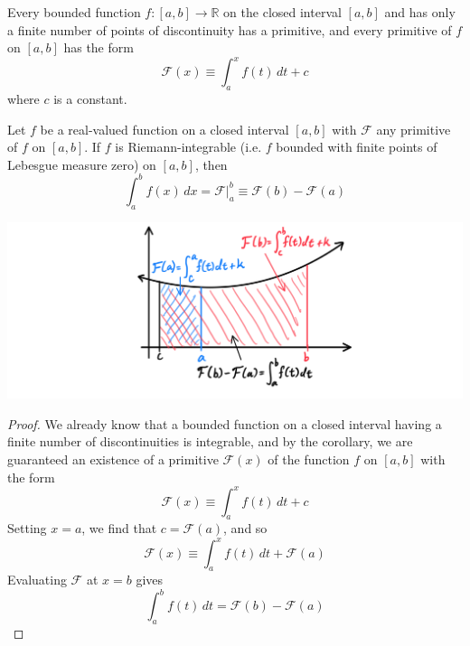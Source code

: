     \begin{corollary}
    Every bounded function $f: [a, b] \longrightarrow \mathbb{R}$ on the closed interval $[a, b]$ and has only a finite number of points of discontinuity has a primitive, and every primitive of $f$ on $[a, b]$ has the form 
    \[\mathcal{F}(x) \equiv \int_a^x f(t)\,dt + c\]
    where $c$ is a constant. 
    \end{corollary}

    \begin{theorem}
    Let $f$ be a real-valued function on a closed interval $[a, b]$ with $\mathcal{F}$ any primitive of $f$ on $[a, b]$. If $f$ is Riemann-integrable (i.e. $f$ bounded with finite points of Lebesgue measure zero) on $[a, b]$, then 
    \[\int_a^b f(x)\,dx  = \mathcal{F} \big|_a^b \equiv \mathcal{F}(b) - \mathcal{F}(a)\]
    \begin{center}
        \includegraphics[scale=0.25]{img/Second_Fundamental_Theorem_Analysis.PNG}
    \end{center}
    \end{theorem}
    \begin{proof}
    We already know that a bounded function on a closed interval having a finite number of discontinuities is integrable, and by the corollary, we are guaranteed an existence of a primitive $\mathcal{F}(x)$ of the function $f$ on $[a, b]$ with the form 
    \[\mathcal{F} (x) \equiv \int_a^x f(t)\,dt + c\]
    Setting $x = a$, we find that $c = \mathcal{F}(a)$, and so 
    \[\mathcal{F}(x) \equiv \int_a^x f(t)\,dt + \mathcal{F}(a)\]
    Evaluating $\mathcal{F}$ at $x = b$ gives
    \[\int_a^b f(t)\,dt = \mathcal{F}(b) - \mathcal{F}(a)\]
    \end{proof}

